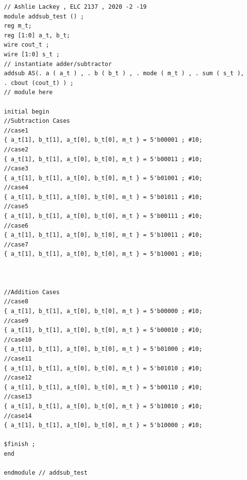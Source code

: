 \documentclass[11pt]{article}
\begin{document}
\begin{lstlisting}[style=Verilog,caption=2-bit Adder Testbench Code,label=code:ex ]
// Ashlie Lackey , ELC 2137 , 2020 -2 -19
module addsub_test () ;
reg m_t;
reg [1:0] a_t, b_t;
wire cout_t ;
wire [1:0] s_t ;
// instantiate adder/subtractor
addsub AS(. a ( a_t ) , . b ( b_t ) , . mode ( m_t ) , . sum ( s_t ), . cbout (cout_t) ) ;
// module here

initial begin
//Subtraction Cases
//case1
{ a_t[1], b_t[1], a_t[0], b_t[0], m_t } = 5'b00001 ; #10;
//case2
{ a_t[1], b_t[1], a_t[0], b_t[0], m_t } = 5'b00011 ; #10;
//case3
{ a_t[1], b_t[1], a_t[0], b_t[0], m_t } = 5'b01001 ; #10;
//case4
{ a_t[1], b_t[1], a_t[0], b_t[0], m_t } = 5'b01011 ; #10;
//case5
{ a_t[1], b_t[1], a_t[0], b_t[0], m_t } = 5'b00111 ; #10;
//case6
{ a_t[1], b_t[1], a_t[0], b_t[0], m_t } = 5'b10011 ; #10;
//case7
{ a_t[1], b_t[1], a_t[0], b_t[0], m_t } = 5'b10001 ; #10;



//Addition Cases
//case8
{ a_t[1], b_t[1], a_t[0], b_t[0], m_t } = 5'b00000 ; #10;
//case9
{ a_t[1], b_t[1], a_t[0], b_t[0], m_t } = 5'b00010 ; #10;
//case10
{ a_t[1], b_t[1], a_t[0], b_t[0], m_t } = 5'b01000 ; #10;
//case11
{ a_t[1], b_t[1], a_t[0], b_t[0], m_t } = 5'b01010 ; #10;
//case12
{ a_t[1], b_t[1], a_t[0], b_t[0], m_t } = 5'b00110 ; #10;
//case13
{ a_t[1], b_t[1], a_t[0], b_t[0], m_t } = 5'b10010 ; #10;
//case14
{ a_t[1], b_t[1], a_t[0], b_t[0], m_t } = 5'b10000 ; #10;

$finish ;
end

endmodule // addsub_test


\end{lstlisting}
\end{document}
